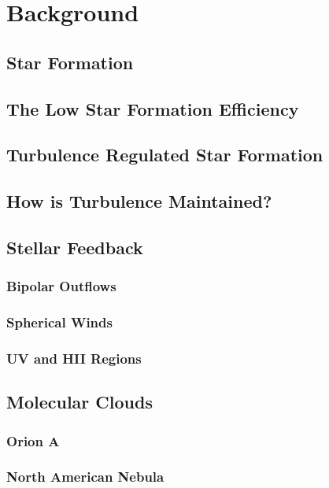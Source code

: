 \section{Background}

\subsection{Star Formation}

\subsection{The Low Star Formation Efficiency}

\subsection{Turbulence Regulated Star Formation}

\subsection{How is Turbulence Maintained?}

\subsection{Stellar Feedback}

\subsubsection{Bipolar Outflows}

\subsubsection{Spherical Winds}

\subsubsection{UV and HII Regions}

\subsection{Molecular Clouds}

\subsubsection{Orion A}

\subsubsection{North American Nebula}
  
  